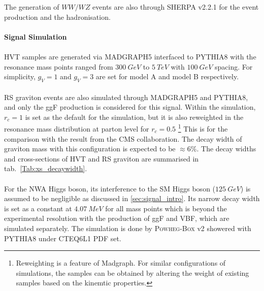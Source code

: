 The generation of $WW/WZ$ events are also through \textsc{SHERPA} v2.2.1 for the event production and the hadronisation. 
\\
\\{\bf Signal Simulation}
\\
\\HVT samples are generated via \textsc{MADGRAPH5}\cite{Alwall:2014hca} interfaced to \textsc{PYTHIA8}\cite{Sjostrand:2007gs} with the resonance mass points ranged from $300~GeV$ to $5~TeV$ with $100~GeV$ spacing. For simplicity, $g_V=1$ and $g_V=3$ are set for model A and model B respectively.
\\
\\RS graviton events are also simulated through \textsc{MADGRAPH5} and \textsc{PYTHIA8}, and only the ggF production is considered for this signal. Within the simulation, $r_{c}=1$ is set as the default for the simulation, but it is also reweighted in the resonance mass distribution at parton level for $r_{c}=0.5$ \footnote{Reweighting is a feature of Madgraph. For similar configurations of simulations, the samples can be obtained by altering the weight of existing samples based on the kinemtic properties.} This is for the comparison with the result from the CMS collaboration. The decay width of graviton mass with this configuration is expected to be $\approx6\%$. The decay widths and cross-sections of HVT and RS graviton are summarised in tab.~\ref{Tab:xs_decaywidth}.
\\
\\For the NWA Higgs boson, its interference to the SM Higgs boson ($125~GeV$) is assumed to be negligible as discussed in \ref{sec:signal_intro}. Its narrow decay width is set as a constant at $4.07~MeV$ for all mass points which is beyond the experimental resolution with the production of ggF and VBF, which are simulated separately. The simulation is done by \textsc{Powheg-Box} v2 showered with \textsc{PYTHIA8} under \textsc{CTEQ6L1} PDF set. 
